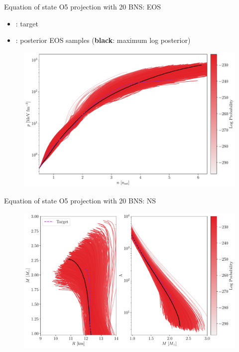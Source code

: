 \documentclass[usenames,dvipsnames,t]{beamer}
\begin{document}
\begin{frame}{Equation of state O5 projection with 20 BNS: EOS}

  \vspace{-2mm}
  \begin{itemize}
    \item \textbf{}: target
    \item \textbf{}: posterior EOS samples (\textbf{black}: maximum log posterior)
  \end{itemize}

  \begin{figure}
    \centering
    \includegraphics[scale=0.40]{Figures/postprocessing_EOS.pdf}
  \end{figure}
\end{frame}

\begin{frame}{Equation of state O5 projection with 20 BNS: NS}
  \begin{figure}
    \centering
    \includegraphics[scale=0.40]{Figures/postprocessing_NS.pdf}
  \end{figure}
\end{frame}
\end{document}
